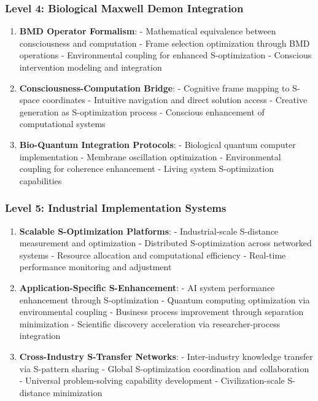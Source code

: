 \documentclass[11pt]{article}
\theoremstyle{definition}
\theoremstyle{remark}
\begin{document}
\subsubsection{Level 4: Biological Maxwell Demon Integration}

\begin{enumerate}
\item \textbf{BMD Operator Formalism}:
   - Mathematical equivalence between consciousness and computation
   - Frame selection optimization through BMD operations
   - Environmental coupling for enhanced S-optimization
   - Conscious intervention modeling and integration

\item \textbf{Consciousness-Computation Bridge}:
   - Cognitive frame mapping to S-space coordinates
   - Intuitive navigation and direct solution access
   - Creative generation as S-optimization process
   - Conscious enhancement of computational systems

\item \textbf{Bio-Quantum Integration Protocols}:
   - Biological quantum computer implementation
   - Membrane oscillation optimization
   - Environmental coupling for coherence enhancement
   - Living system S-optimization capabilities
\end{enumerate}

\subsubsection{Level 5: Industrial Implementation Systems}

\begin{enumerate}
\item \textbf{Scalable S-Optimization Platforms}:
   - Industrial-scale S-distance measurement and optimization
   - Distributed S-optimization across networked systems
   - Resource allocation and computational efficiency
   - Real-time performance monitoring and adjustment

\item \textbf{Application-Specific S-Enhancement}:
   - AI system performance enhancement through S-optimization
   - Quantum computing optimization via environmental coupling
   - Business process improvement through separation minimization
   - Scientific discovery acceleration via researcher-process integration

\item \textbf{Cross-Industry S-Transfer Networks}:
   - Inter-industry knowledge transfer via S-pattern sharing
   - Global S-optimization coordination and collaboration
   - Universal problem-solving capability development
   - Civilization-scale S-distance minimization
\end{enumerate}
\end{document}
